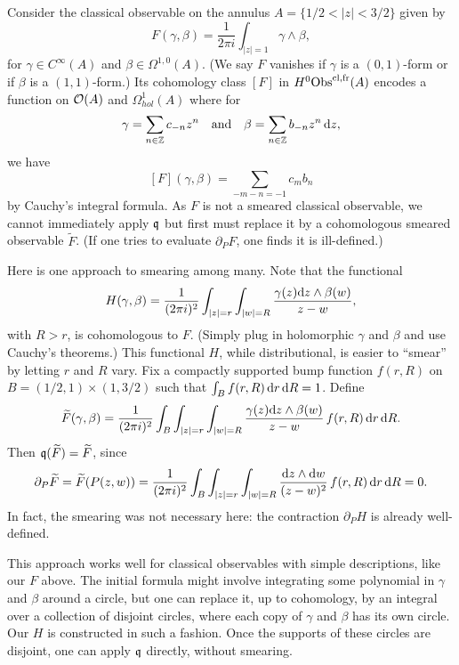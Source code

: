 Consider the classical observable on the annulus $A = \{1/2 < |z| < 3/2\}$ given by
\[
F(\gamma,\beta) = \frac{1}{2\pi i}\int_{|z| = 1} \gamma \wedge \beta,
\]
for $\gamma \in C^\infty(A)$ and $\beta \in \Omega^{1,0}(A)$.
(We say $F$ vanishes if $\gamma$ is a $(0,1)$-form or if $\beta$ is a $(1,1)$-form.)
Its cohomology class $[F]$ in $H^0 {\rm Obs}^{{\rm cl},{\rm fr}}(A)$ encodes a function on $\mathcal O(A)$ and $\Omega^1_{hol}(A)$
where for 
\[
\gamma = \sum_{n \in \mathbb Z} c_{-n} z^n \quad \text{and} \quad \beta = \sum_{n \in \mathbb Z} b_{-n} z^n \, {\rm d} z,
\]
we have
\[
[F](\gamma,\beta) =  \sum_{-m - n = -1} c_m b_n
\]
by Cauchy's integral formula.
As $F$ is not a smeared classical observable, 
we cannot immediately apply $\frak{q}$ but first must replace it by a cohomologous smeared observable $\widetilde{F}$.
(If one tries to evaluate $\partial_P F$, one finds it is ill-defined.)

Here is one approach to smearing among many.
Note that the functional
\[
H(\gamma,\beta) = \frac{1}{(2\pi i)^2} \int_{|z| = r} \int_{|w| = R} \frac{\gamma(z) {\rm d} z \wedge \beta(w)}{z-w},
\]
with $R > r$, is cohomologous to $F$.
(Simply plug in holomorphic $\gamma$ and $\beta$ and use Cauchy's theorems.)
This functional $H$, while distributional, is easier to ``smear''
by letting $r$ and $R$ vary.
Fix a compactly supported bump function $f(r,R)$ on $B = (1/2,1) \times (1,3/2)$ such that $\int_B f(r,R) \,{\rm d} r \, {\rm d} R = 1$.
Define
\[
\widetilde{F}(\gamma,\beta) = 
\frac{1}{(2\pi i)^2} \int_B  \int_{|z| = r} \int_{|w| = R} \frac{\gamma(z) {\rm d} z \wedge \beta(w)}{z-w}\, f(r,R) \,{\rm d} r \, {\rm d} R.
\]
Then $\frak{q}(\widetilde{F}) = \widetilde{F}$, since 
\[
\partial_P \widetilde{F} = \widetilde{F}(P(z,w)) = \frac{1}{(2\pi i)^2} \int_B  \int_{|z| = r} \int_{|w| = R} \frac{{\rm d} z \wedge {\rm d} w}{(z-w)^2}\, f(r,R) \,{\rm d} r \, {\rm d} R = 0.
\]
In fact, the smearing was not necessary here: the contraction $\partial_P H$ is already well-defined.

\begin{rmk}
\label{promotion}
This approach works well for classical observables with simple descriptions, like our $F$ above.
The initial formula might involve integrating some polynomial in $\gamma$ and $\beta$ around a circle,
but one can replace it, up to cohomology, by an integral over a collection of disjoint circles,
where each copy of $\gamma$ and $\beta$ has its own circle.
Our $H$ is constructed in such a fashion.
Once the supports of these circles are disjoint, 
one can apply $\frak{q}$ directly, without smearing.
\end{rmk}


